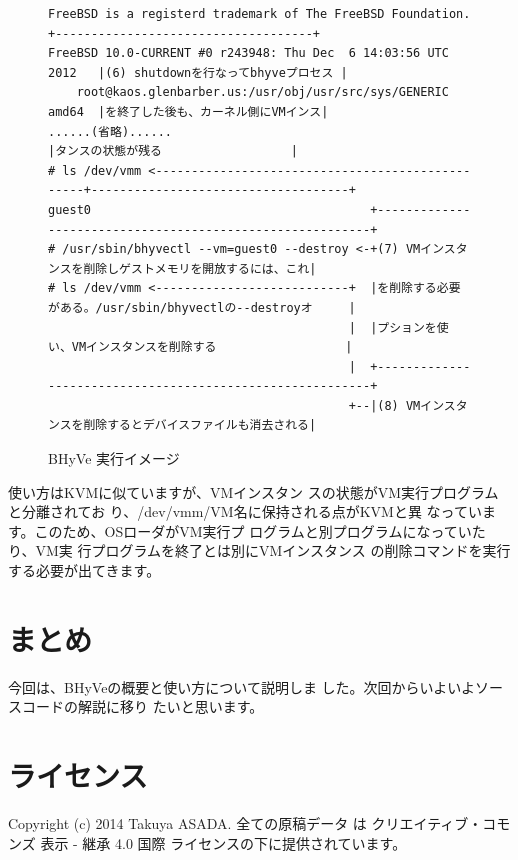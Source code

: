 \begin{figure}
{\begin{verbatim}
FreeBSD is a registerd trademark of The FreeBSD Foundation.     +------------------------------------+
FreeBSD 10.0-CURRENT #0 r243948: Thu Dec  6 14:03:56 UTC 2012   |(6) shutdownを行なってbhyveプロセス |
    root@kaos.glenbarber.us:/usr/obj/usr/src/sys/GENERIC amd64  |を終了した後も、カーネル側にVMインス|
......(省略)......                                              |タンスの状態が残る                  |
# ls /dev/vmm <-------------------------------------------------+------------------------------------+
guest0                                       +----------------------------------------------------------+
# /usr/sbin/bhyvectl --vm=guest0 --destroy <-+(7) VMインスタンスを削除しゲストメモリを開放するには、これ|
# ls /dev/vmm <---------------------------+  |を削除する必要がある。/usr/sbin/bhyvectlの--destroyオ     |
                                          |  |プションを使い、VMインスタンスを削除する                  |
                                          |  +----------------------------------------------------------+
                                          +--|(8) VMインスタンスを削除するとデバイスファイルも消去される|

\end{verbatim}
}
\caption{BHyVe 実行イメージ}
\label{fig2}
\end{figure}

 使い方はKVMに似ていますが、VMインスタン
スの状態がVM実行プログラムと分離されてお
り、/dev/vmm/VM名に保持される点がKVMと異
なっています。このため、OSローダがVM実行プ
ログラムと別プログラムになっていたり、VM実
行プログラムを終了とは別にVMインスタンス
の削除コマンドを実行する必要が出てきます。


\section{まとめ}

 今回は、BHyVeの概要と使い方について説明しま
した。次回からいよいよソースコードの解説に移り
たいと思います。

\section{ライセンス}
Copyright (c) 2014 Takuya ASADA.
全ての原稿データ は クリエイティブ・コモンズ 表示 - 継承 4.0 国際 ライセンスの下に提供されています。



